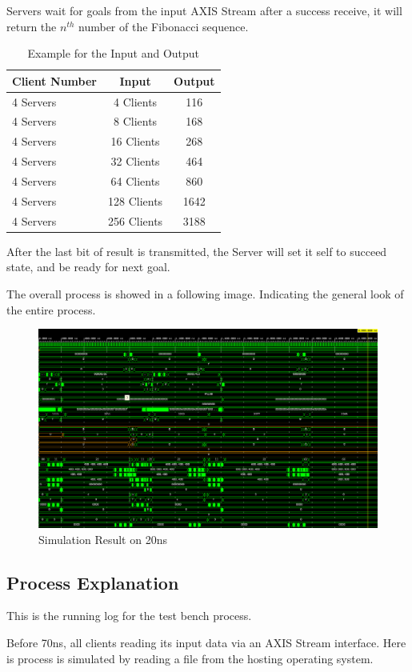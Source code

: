 Servers wait for goals from the input AXIS Stream after a success receive, it will return the $n^{th}$ number of the Fibonacci sequence.
\begin{table}[htb]
	\centering
	\caption{Example for the Input and Output}
	\begin{tabular}{l c c}
		\toprule
		Client Number  & Input  & Output\\ \midrule
        4	Servers	&	4	Clients	&	116	\\
        4	Servers	&	8	Clients	&	168	\\
        4	Servers	&	16	Clients	&	268	\\
        4	Servers	&	32	Clients	&	464	\\
        4	Servers	&	64	Clients	&	860	\\
        4	Servers	&	128	Clients	&	1642	\\
        4	Servers	&	256	Clients	&	3188	\\
		\bottomrule
	\end{tabular}
	\label{tab:sim-io}
\end{table}
After the last bit of result is transmitted, the Server will set it self to succeed state, and be ready for next goal. 

The overall process is showed in a following image. Indicating the general look of the entire process.

\begin{figure}[htb]
	\centering
	\includegraphics[width=.7\linewidth]{figures/sim.png}
	\caption{Simulation Result on 20ns}
	\label{fig:sim-overall}
\end{figure}


\subsection{Process Explanation}

This is the running log for the test bench process.

Before 70ns, all clients reading its input data via an AXIS Stream interface. Here is process is simulated by reading a file from the hosting operating system.

